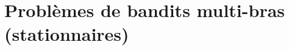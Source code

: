 \documentclass[11pt,french,ignorenonframetext,]{beamer}
\begin{document}







\section{\hfill{}Problèmes de bandits multi-bras (stationnaires)\hfill{}}







\end{document}
